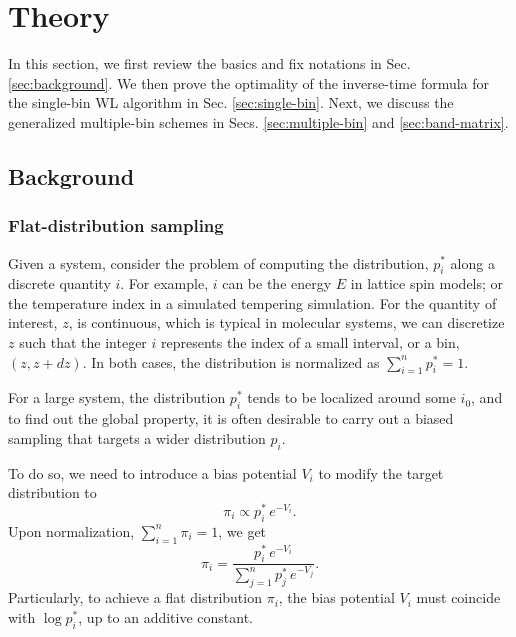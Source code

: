 \documentclass[reprint]{revtex4-1}
\begin{document}
\section{\label{sec:theory}
Theory}


In this section,
we first review the basics and fix notations
in Sec. \ref{sec:background}.
%
We then prove the optimality
of the inverse-time formula
for the single-bin WL algorithm
in Sec. \ref{sec:single-bin}.
%
Next, we discuss the generalized
multiple-bin schemes
in Secs. \ref{sec:multiple-bin}
and \ref{sec:band-matrix}.
%



\subsection{\label{sec:background}
Background}



\subsubsection{Flat-distribution sampling}



Given a system,
consider the problem of computing
the distribution, $p^*_i$
along a discrete quantity $i$.
%
%
For example, $i$ can be the energy $E$
in lattice spin models; or the temperature index
in a simulated tempering simulation.
%
For the quantity of interest, $z$, is continuous,
which is typical in molecular systems,
we can discretize $z$
such that the integer $i$ represents
the index of a small interval, or a bin, $(z, z + dz)$.
%
In both cases,
the distribution is normalized as
$\sum_{i = 1}^n p^*_i = 1$.



For a large system,
the distribution $p^*_i$ tends to
be localized around some $i_0$,
%
and to find out the global property,
it is often desirable to carry out
a biased sampling that targets
a wider distribution $p_i$.
%



To do so, we need to introduce a bias potential $V_i$
to modify the target distribution to
%
\begin{equation}
  \pi_i \propto p^*_i \, e^{-V_i}.
  \label{eq:pi_p_phi1}
\end{equation}
%
Upon normalization, $\sum_{i = 1}^n \pi_i = 1$,
we get
%
\begin{equation}
  \pi_i =
  \frac{ p^*_i \, e^{-V_i} }
  { \sum_{j = 1}^n p^*_j \, e^{-V_j} }.
  \label{eq:pi_p_phi}
\end{equation}
%
Particularly,
to achieve a flat distribution $\pi_i$,
the bias potential $V_i$
must coincide with $\log p^*_i$,
up to an additive constant.
\end{document}
